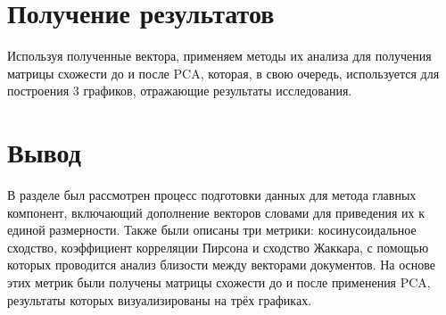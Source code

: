 \section{Получение результатов}

Используя полученные вектора, применяем методы их анализа для получения матрицы схожести до и после PCA,
которая, в свою очередь, используется для построения 3 графиков, отражающие результаты
исследования.

\section*{Вывод}

В разделе был рассмотрен процесс подготовки данных для метода главных компонент, 
включающий дополнение векторов словами для приведения их к единой размерности. 
Также были описаны три метрики: косинусоидальное сходство, коэффициент корреляции Пирсона и сходство Жаккара, 
с помощью которых проводится анализ близости между векторами документов. На основе этих метрик были получены матрицы схожести 
до и после применения PCA, результаты которых визуализированы на трёх графиках.

\clearpage
